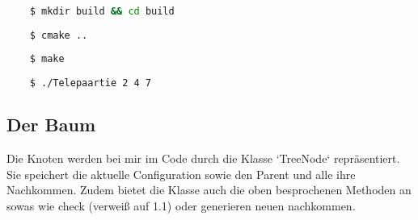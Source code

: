 \documentclass{article}
\begin{document}
\begin{lstlisting}[language=Bash]
	
	$ mkdir build && cd build
	
	$ cmake ..
	
	$ make
	
	$ ./Telepaartie 2 4 7

\end{lstlisting}

\subsection*{ Der Baum }

Die Knoten werden bei mir im Code durch die Klasse `TreeNode` repräsentiert. Sie speichert die aktuelle Configuration sowie den Parent und alle ihre Nachkommen. Zudem bietet die Klasse auch die oben besprochenen Methoden an sowas wie check (verweiß auf 1.1) oder generieren neuen nachkommen.
\end{document}
